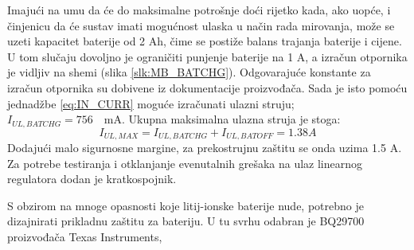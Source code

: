 Imajući na umu da će do maksimalne potrošnje doći rijetko kada, ako uopće, i činjenicu da će sustav imati mogućnost ulaska u način rada mirovanja, može se uzeti kapacitet baterije od 2 Ah, čime se postiže balans trajanja baterije i cijene. U tom slučaju dovoljno je ograničiti punjenje baterije na 1 A, a izračun otpornika je vidljiv na shemi (slika \ref{slk:MB_BATCHG}). Odgovarajuće konstante za izračun otpornika su dobivene iz dokumentacije proizvođača. Sada je isto pomoću jednadžbe \ref{eq:IN_CURR} moguće izračunati ulazni struju; ${I_{UL,BATCHG} = 756\quad \textrm{mA}}$. Ukupna maksimalna ulazna struja je stoga:
\begin{equation}
    I_{UL,MAX}=I_{UL,BATCHG}+I_{UL,BATOFF} = 1.38 A
\end{equation}
Dodajući malo sigurnosne margine, za prekostrujnu zaštitu se onda uzima 1.5 A. Za potrebe testiranja i otklanjanje evenutalnih grešaka na ulaz linearnog regulatora dodan je kratkospojnik.

S obzirom na mnoge opasnosti koje litij-ionske baterije nude, potrebno je dizajnirati prikladnu zaštitu za bateriju. U tu svrhu odabran je BQ29700 proizvođača Texas Instruments,